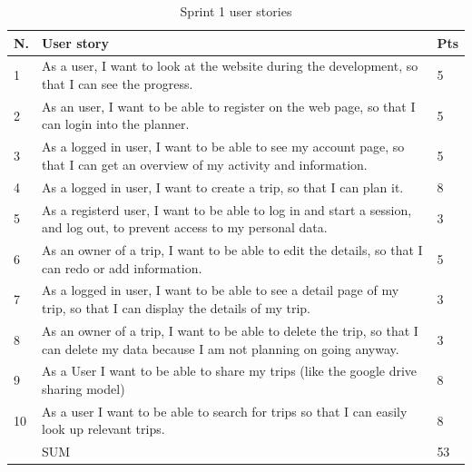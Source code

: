 \documentclass[a4paper]{article}
\begin{document}
\begin{table}[!h]
  \begin{tabulary}{1.0\textwidth}{|L|L|L|}
    \hline
    N. & User story & Pts \\ \hline
    
    1&As a user, I want to look at the website during the development, so that I can see the progress.
    & 5 \\ \hline
    
    2&As an user, I want to be able to register on the web page, so that I can login into the planner.
    & 5 \\ \hline

    3&As a logged in user, I want to be able to see my account page, so that I can get an overview of my activity and information.
    & 5 \\ \hline

    4&As a logged in user, I want to create a trip, so that I can plan it. 
    & 8 \\ \hline

    5&As a registerd user, I want to be able to log in and start a session, and log out, to prevent access to my personal data. & 3 \\ \hline

    6&As an owner of a trip, I want to be able to edit the details, so that I can redo or add information. & 5 \\ \hline

    7&As a logged in user, I want to be able to see a detail page of my trip, so that I can display the details of my trip. & 3 \\ \hline

    8&As an owner of a trip, I want to be able to delete the trip, so that I can delete my data because I am not planning on going anyway. & 3 \\ \hline

    9&As a User I want to be able to share my trips (like the google drive sharing model) & 8 \\ \hline

    10&As a user I want to be able to search for trips so that I can easily look up relevant trips. & 8 \\ \hline
    &SUM & 53 \\ \hline
  \end{tabulary}
  \caption{Sprint 1 user stories}
\end{table}
\end{document}
